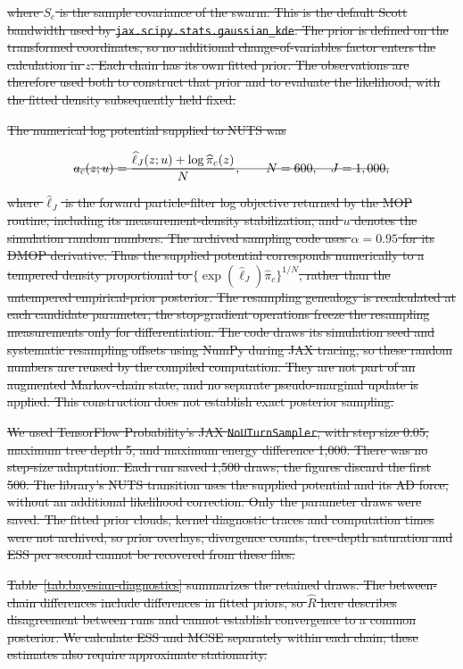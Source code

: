 \documentclass[11pt]{article}
\theoremstyle{thmstylethree}%
\begin{document}
\sout{where \mbox{$S_c$} is the sample covariance of the swarm. This is the default
Scott bandwidth used by \texttt{jax.scipy.stats.gaussian\_kde}.
The prior is defined on the transformed coordinates, so no additional
change-of-variables factor enters the calculation in \mbox{$z$}.
Each chain has its own fitted prior. The observations are therefore used
both to construct that prior and to evaluate the likelihood, with the
fitted density subsequently held fixed.}

\sout{The numerical log potential supplied to NUTS was}

\[\text{\sout{\mbox{$\displaystyle a_c(z;u)=\frac{\widehat\ell_J(z;u)+\log\widehat\pi_c(z)}{N},
 \qquad N=600,\quad J=1,000,$}}}\]

\sout{where \mbox{$\widehat\ell_J$} is the forward particle-filter log objective
returned by the MOP routine, including its measurement-density stabilization,
and \mbox{$u$} denotes the simulation random numbers.
The archived sampling code uses \mbox{$\alpha=0.95$} for its DMOP derivative.
Thus the supplied potential corresponds numerically to a tempered density
proportional to \mbox{$\{\exp(\widehat\ell_J)\widehat\pi_c\}^{1/N}$},
rather than the untempered empirical-prior posterior.
The resampling genealogy is recalculated at each candidate parameter;
the stop-gradient operations freeze the resampling measurements only
for differentiation. The code draws its simulation seed and systematic
resampling offsets using NumPy during JAX tracing, so these random
numbers are reused by the compiled computation. They are not part of
an augmented Markov-chain state, and no separate pseudo-marginal update
is applied. This construction does not establish exact posterior sampling.}

\sout{We used TensorFlow Probability's JAX \texttt{NoUTurnSampler}, with step
size 0.05, maximum tree depth 5, and maximum energy difference 1,000.
There was no step-size adaptation. Each run saved 1,500 draws; the figures
discard the first 500. The library's NUTS transition uses the supplied
potential and its AD force, without an additional likelihood correction.
Only the parameter draws were saved. The fitted prior clouds, kernel
diagnostic traces and computation times were not archived, so prior
overlays, divergence counts, tree-depth saturation and ESS per second
cannot be recovered from these files.}

\sout{Table~\mbox{\ref{tab:bayesian-diagnostics}} summarizes the retained draws.
The between-chain differences include differences in fitted priors, so
\mbox{$\widehat R$} here describes disagreement between runs and cannot establish
convergence to a common posterior. We calculate ESS and MCSE separately
within each chain; these estimates also require approximate stationarity.}
\end{document}
